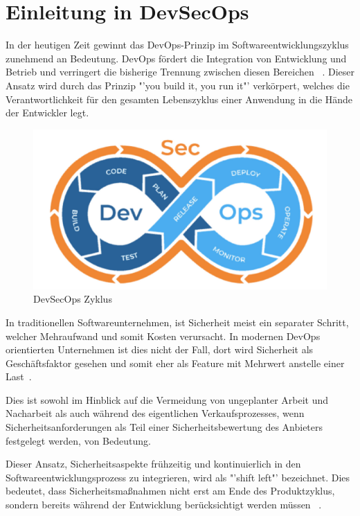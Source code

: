 \section{Einleitung in DevSecOps}
In der heutigen Zeit gewinnt das DevOps-Prinzip im Softwareentwicklungszyklus zunehmend an Bedeutung. DevOps fördert die Integration von Entwicklung und Betrieb und verringert die bisherige Trennung zwischen diesen Bereichen ~\cite{Sharma2013}.  Dieser Ansatz wird durch das Prinzip "'you build it, you run it"' verkörpert, welches die Verantwortlichkeit für den gesamten Lebenszyklus einer Anwendung in die Hände der Entwickler legt.

\begin{figure}[h!]
  \includegraphics[width=\linewidth]{img/DevSecOps.png}
  \caption{DevSecOps Zyklus ~\cite{Haug2020}}
  \label{fig:devsecops}
\end{figure}

In traditionellen Softwareunternehmen, ist Sicherheit meist ein separater Schritt, welcher Mehraufwand und somit Kosten verursacht. In modernen DevOps orientierten Unternehmen ist dies nicht der Fall, dort wird Sicherheit als Geschäftsfaktor gesehen und somit eher als Feature mit Mehrwert anstelle einer Last~\cite{Wong2024}.

Dies ist sowohl im Hinblick auf die Vermeidung von ungeplanter Arbeit und Nacharbeit als auch während des eigentlichen Verkaufsprozesses, wenn Sicherheitsanforderungen als Teil einer Sicherheitsbewertung des Anbieters festgelegt werden, von Bedeutung.

Dieser Ansatz, Sicherheitsaspekte frühzeitig und kontinuierlich in den Softwareentwicklungsprozess zu integrieren, wird als "'shift left"' bezeichnet. Dies bedeutet, dass Sicherheitsmaßnahmen nicht erst am Ende des Produktzyklus, sondern bereits während der Entwicklung berücksichtigt werden müssen ~\cite{Haug2020}.

